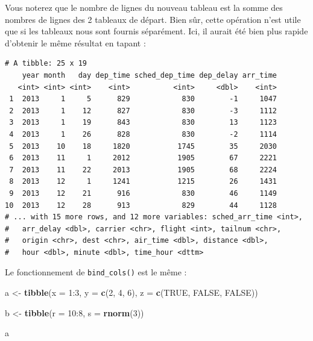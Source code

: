 \documentclass[
  a4paper,
]{article}
\newenvironment{Shaded}{\begin{snugshade}}{\end{snugshade}}
\newcommand{\DataTypeTok}[1]{\textcolor[rgb]{0.00,0.34,0.68}{#1}}
\newcommand{\DecValTok}[1]{\textcolor[rgb]{0.69,0.50,0.00}{#1}}
\newcommand{\KeywordTok}[1]{\textcolor[rgb]{0.12,0.11,0.11}{\textbf{#1}}}
\newcommand{\NormalTok}[1]{\textcolor[rgb]{0.12,0.11,0.11}{#1}}
\newcommand{\OperatorTok}[1]{\textcolor[rgb]{0.12,0.11,0.11}{#1}}
\newcommand{\OtherTok}[1]{\textcolor[rgb]{0.00,0.43,0.16}{#1}}
\newcommand{\StringTok}[1]{\textcolor[rgb]{0.75,0.01,0.01}{#1}}
\begin{document}
Vous noterez que le nombre de lignes du nouveau tableau est la somme des nombres de lignes des 2 tableaux de départ. Bien sûr, cette opération n'est utile que si les tableaux nous sont fournis séparément. Ici, il aurait été bien plus rapide d'obtenir le même résultat en tapant :

\begin{Shaded}
\end{Shaded}

\begin{verbatim}
# A tibble: 25 x 19
    year month   day dep_time sched_dep_time dep_delay arr_time
   <int> <int> <int>    <int>          <int>     <dbl>    <int>
 1  2013     1     5      829            830        -1     1047
 2  2013     1    12      827            830        -3     1112
 3  2013     1    19      843            830        13     1123
 4  2013     1    26      828            830        -2     1114
 5  2013    10    18     1820           1745        35     2030
 6  2013    11     1     2012           1905        67     2221
 7  2013    11    22     2013           1905        68     2224
 8  2013    12     1     1241           1215        26     1431
 9  2013    12    21      916            830        46     1149
10  2013    12    28      913            829        44     1128
# ... with 15 more rows, and 12 more variables: sched_arr_time <int>,
#   arr_delay <dbl>, carrier <chr>, flight <int>, tailnum <chr>,
#   origin <chr>, dest <chr>, air_time <dbl>, distance <dbl>,
#   hour <dbl>, minute <dbl>, time_hour <dttm>
\end{verbatim}

Le fonctionnement de \texttt{bind\_cols()} est le même :

\begin{Shaded}
\begin{Highlighting}[]
\NormalTok{a <-}\StringTok{ }\KeywordTok{tibble}\NormalTok{(}\DataTypeTok{x =} \DecValTok{1}\OperatorTok{:}\DecValTok{3}\NormalTok{, }
            \DataTypeTok{y =} \KeywordTok{c}\NormalTok{(}\DecValTok{2}\NormalTok{, }\DecValTok{4}\NormalTok{, }\DecValTok{6}\NormalTok{),}
            \DataTypeTok{z =} \KeywordTok{c}\NormalTok{(}\OtherTok{TRUE}\NormalTok{, }\OtherTok{FALSE}\NormalTok{, }\OtherTok{FALSE}\NormalTok{))}

\NormalTok{b <-}\StringTok{ }\KeywordTok{tibble}\NormalTok{(}\DataTypeTok{r =} \DecValTok{10}\OperatorTok{:}\DecValTok{8}\NormalTok{, }
            \DataTypeTok{s =} \KeywordTok{rnorm}\NormalTok{(}\DecValTok{3}\NormalTok{))}

\NormalTok{a}
\end{Highlighting}
\end{Shaded}
\end{document}
